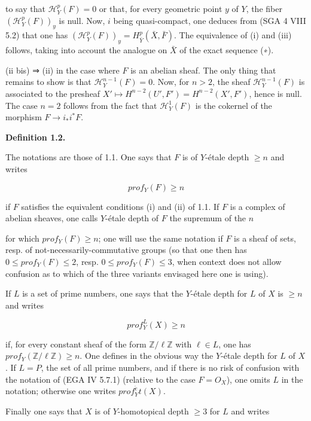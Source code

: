 \documentclass[
]{article}
\begin{document}
to say that \(\mathcal{H}^{p}_{Y}(F) = 0\) or that, for every geometric
point \(y\) of \(Y\), the fiber \((\mathcal{H}^{p}_{Y}(F))_{y}\) is
null. Now, \(i\) being quasi-compact, one deduces from (SGA 4 VIII 5.2)
that one has
\((\mathcal{H}^{p}_{Y}(F))_{y} = H^{p}_{\bar{Y}}(\bar{X}, \bar{F})\).
The equivalence of (i) and (iii) follows, taking into account the
analogue on \(\bar{X}\) of the exact sequence (∗).

(ii bis) ⇒ (ii) in the case where \(F\) is an abelian sheaf. The only
thing that remains to show is that \(\mathcal{H}^{n-1}_{Y}(F) = 0\).
Now, for \(n > 2\), the sheaf \(\mathcal{H}^{n-1}_{Y}(F)\) is associated
to the presheaf \(X' \mapsto H^{n-2}(U', F') = H^{n-2}(X', F')\), hence
is null. The case \(n = 2\) follows from the fact that
\(\mathcal{H}^{1}_{Y}(F)\) is the cokernel of the morphism
\(F \to i_{*} i^{*} F\).

\textbf{Definition 1.2.}

The notations are those of 1.1. One says that \(F\) is of \(Y\)-étale
depth \(\geqslant n\) and writes

\[
prof_{Y}(F) \geqslant n
\]

if \(F\) satisfies the equivalent conditions (i) and (ii) of 1.1. If
\(F\) is a complex of abelian sheaves, one calls \(Y\)-étale depth of
\(F\) the supremum of the \(n\)

for which \(prof_{Y}(F) \geqslant n\); one will use the same notation if
\(F\) is a sheaf of sets, resp. of not-necessarily-commutative groups
(so that one then has \(0 \leqslant prof_{Y}(F) \leqslant 2\), resp.
\(0 \leqslant prof_{Y}(F) \leqslant 3\), when context does not allow
confusion as to which of the three variants envisaged here one is
using).

If \(L\) is a set of prime numbers, one says that the \(Y\)-étale depth
for \(L\) of \(X\) is \(\geqslant n\) and writes

\[
prof^{L}_{Y}(X) \geqslant n
\]

if, for every constant sheaf of the form \(\mathbb{Z}/\ell \mathbb{Z}\)
with \(\ell \in L\), one has
\(prof_{Y}(\mathbb{Z}/\ell \mathbb{Z}) \geqslant n\). One defines in the
obvious way the \(Y\)-étale depth for \(L\) of \(X\). If \(L = P\), the
set of all prime numbers, and if there is no risk of confusion with the
notation of (EGA IV 5.7.1) (relative to the case \(F = O_{X}\)), one
omits \(L\) in the notation; otherwise one writes
\(prof^{\acute{e}}_{Y}t(X)\).

Finally one says that \(X\) is of \(Y\)-homotopical depth
\(\geqslant 3\) for \(L\) and writes
\end{document}
